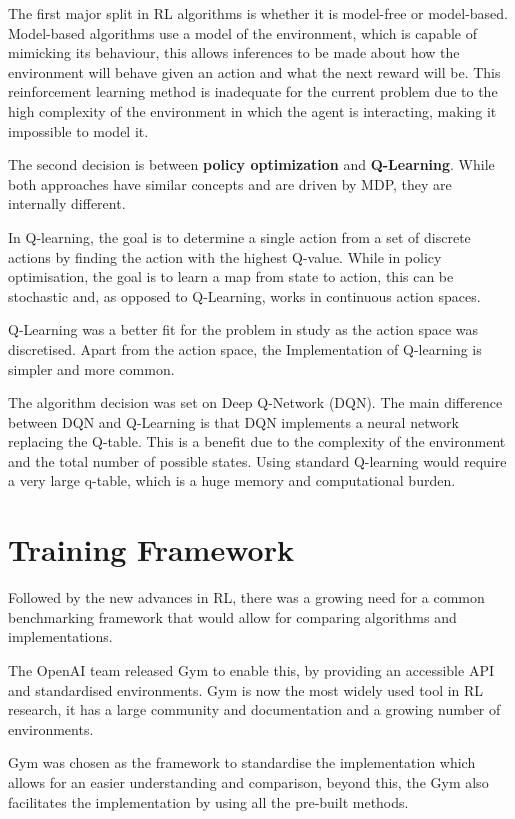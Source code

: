 The first major split in RL algorithms is whether it is model-free or model-based. Model-based algorithms use a model of the environment, which is capable of mimicking its behaviour, this allows inferences to be made about how the environment will behave given an action and what the next reward will be. This reinforcement learning method is inadequate for the current problem due to the high complexity of the environment in which the agent is interacting, making it impossible to model it.

The second decision is between \textbf{policy optimization} and \textbf{Q-Learning}. 
While both approaches have similar concepts and are driven by MDP, they are internally different. 

In Q-learning, the goal is to determine a single action from a set of discrete actions by finding the action with the highest Q-value. While in policy optimisation, the goal is to learn a map from state to action, this can be stochastic and, as opposed to Q-Learning, works in continuous action spaces.

Q-Learning was a better fit for the problem in study as the action space was discretised. Apart from the action space, the Implementation of Q-learning is simpler and more common.

The algorithm decision was set on Deep Q-Network (DQN). The main difference between DQN and Q-Learning is that DQN implements a neural network replacing the Q-table. This is a benefit due to the complexity of the environment and the total number of possible states. Using standard Q-learning would require a very large q-table, which is a huge memory and computational burden.

\section{Training Framework}
Followed by the new advances in RL, there was a growing need for a common benchmarking framework that would allow for comparing algorithms and implementations.

The OpenAI team released Gym to enable this, by providing an accessible API and standardised environments. Gym is now the most widely used tool in RL research, it has a large community and documentation and a growing number of environments\cite{gym}.

Gym was chosen as the framework to standardise the implementation which allows for an easier understanding and comparison, beyond this, the Gym also facilitates the implementation by using all the pre-built methods\cite{openai}.

